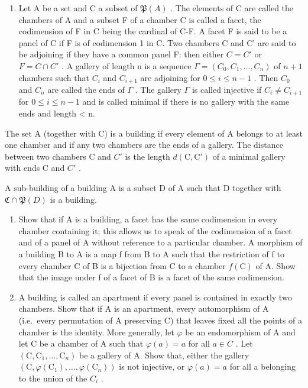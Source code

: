 \begin{enumerate}
\def\labelenumi{\arabic{enumi})}
\setcounter{enumi}{14}
\tightlist
\item
  Let A be a set and C a subset of \(\mathfrak{P}(A)\) . The elements of C are called the chambers of A and a subset F of a chamber C is called a facet, the codimension of F in C being the cardinal of C-F. A facet F is said to be a panel of C if F is of codimension 1 in C. Two chambers C and C' are said to be adjoining if they have a common panel F: then either \(C = C'\) or \(F = C \cap C'\) . A gallery of length n is a sequence \(\Gamma = (C_0, C_1, \ldots, C_n)\) of \(n + 1\) chambers such that \(C_i\) and \(C_{i+1}\) are adjoining for \(0 \leqslant i \leqslant n - 1\) . Then \(C_0\) and \(C_n\) are called the ends of \(\Gamma\) . The gallery \(\Gamma\) is called injective if \(C_i \neq C_{i+1}\) for \(0 \leqslant i \leqslant n - 1\) and is called minimal if there is no gallery with the same ends and length \textless{} n.
\end{enumerate}

The set A (together with C) is a building if every element of A belongs to at least one chamber and if any two chambers are the ends of a gallery. The distance between two chambers C and \(C'\) is the length \(d(\mathrm{C},\mathrm{C}')\) of a minimal gallery with ends C and \(C'\) .

A sub-building of a building A is a subset D of A such that D together with \(\mathfrak{C}\cap\mathfrak{P}(D)\) is a building.

\begin{enumerate}
\def\labelenumi{\alph{enumi})}
\item
  Show that if A is a building, a facet has the same codimension in every chamber containing it; this allows us to speak of the codimension of a facet and of a panel of A without reference to a particular chamber. A morphism of a building B to A is a map f from B to A such that the restriction of f to every chamber C of B is a bijection from C to a chamber \(f(\mathrm{C})\) of A. Show that the image under f of a facet of B is a facet of the same codimension.
\item
  A building is called an apartment if every panel is contained in exactly two chambers. Show that if A is an apartment, every automorphism of A (i.e.~every permutation of A preserving C) that leaves fixed all the points of a chamber is the identity. More generally, let \(\varphi\) be an endomorphism of A and let C be a chamber of A such that \(\varphi(a)=a\) for all \(a\in C\) . Let \((\mathrm{C},\mathrm{C}_{1},\ldots,\mathrm{C}_{n})\) be a gallery of A. Show that, either the gallery \((\mathrm{C},\varphi(\mathrm{C}_{1}),\ldots,\varphi(\mathrm{C}_{n}))\) is not injective, or \(\varphi(a)=a\) for all a belonging to the union of the \(C_{i}\) .
\end{enumerate}

